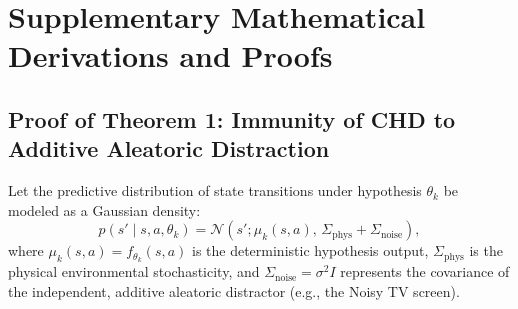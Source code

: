 \appendix
\section{Supplementary Mathematical Derivations and Proofs}
\label{app:proofs}

\subsection{Proof of Theorem 1: Immunity of CHD to Additive Aleatoric Distraction}
\label{app:proof_thm1}

Let the predictive distribution of state transitions under hypothesis $\theta_k$ be modeled as a Gaussian density:
\begin{equation}
    p(s' \mid s, a, \theta_k) = \mathcal{N}\left( s'; \mu_k(s, a), \, \Sigma_{\text{phys}} + \Sigma_{\text{noise}} \right),
\end{equation}
where $\mu_k(s, a) = f_{\theta_k}(s, a)$ is the deterministic hypothesis output, $\Sigma_{\text{phys}}$ is the physical environmental stochasticity, and $\Sigma_{\text{noise}} = \sigma^2 I$ represents the covariance of the independent, additive aleatoric distractor (e.g., the Noisy TV screen).

